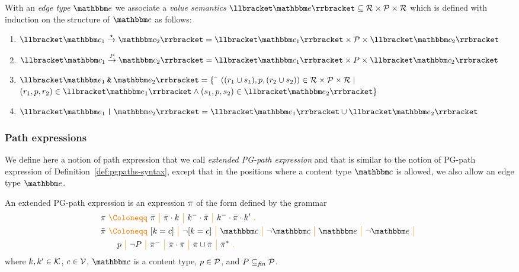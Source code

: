 \begin{definition}
 With an \emph{edge type} $\etype$ we associate a \emph{value semantics} $\sem{\etype} \subseteq \Records \times \Predicates \times \Records$ which is defined with induction on the structure of $\etype$ as follows:
 \begin{enumerate}
   \item $\sem{\et{\ntype_1}{\pwc}{\ntype_2}} = \sem{\ntype_1} \times \Predicates \times \sem{\ntype_2}$
   \item $\sem{\et{\ntype_1}{P}{\ntype_2}} = \sem{\ntype_1} \times P \times \sem{\ntype_2}$   
   \item \begin{tabbing}
         $\sem{ \etype_1 \tAnd \etype_2 } = \{ $ \= $ ( (r_1 \cup s_1), p, (r_2 \cup s_2) ) \in \mathcal{R} \times \mathcal{P} \times \mathcal{R} \mid $ \\
         \> $( r_1, p, r_2 ) \in \sem{\etype_1} \land ( s_1, p, s_2 ) \in \sem{\etype_2} \}$
      \end{tabbing}
   	\item $\sem{ \etype_1 \tOr \etype_2 } = \sem{\etype_1} \cup \sem{\etype_2}$
 \end{enumerate}
\end{definition}

\subsubsection{Path expressions}

We define here a notion of path expression that we call \emph{extended PG-path expression} and that is similar to the notion of PG-path expression of Definition~\ref{def:pgpaths-syntax}, except that in the positions where a content type $\ntype$ is allowed, 
we also allow an edge type $\etype$.

\begin{definition} 
\label{def:ext-pgpaths-syntax}
An extended  PG-path expression is an expression $\pi$ of the form defined by the  grammar
\begin{align*} 
& \pexpr \gDef  \ppexpr \gMid \ppexpr \cdot k \gMid k^{-} \cdot \ppexpr \gMid k^{-} \cdot \ppexpr \cdot  k' \gEnd \\
& \ppexpr \gDef \keyIsVal{k}{c} \gMid \neg \keyIsVal{k}{c} \gMid \ntype \gMid \lnot \ntype \gMid \etype \gMid \lnot \etype \gMid \\
& \quad \quad p \gMid \lnot P \gMid  
{\ppexpr}^{-} \gMid \ppexpr \cdot \ppexpr \gMid \ppexpr \cup \ppexpr \gMid {\ppexpr}^{*} \gEnd
\end{align*}
where $k,k' \in \mathcal{K}$, $c \in \mathcal{V}$, $\ntype$ is a content type, $p \in \mathcal{P}$, and $P \subseteq_{\mathit{fin}} \mathcal{P}$. 
\end{definition}

